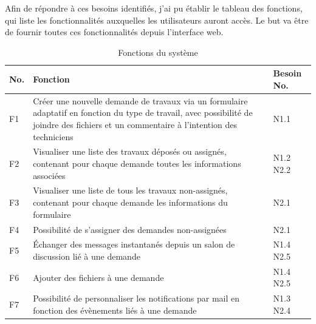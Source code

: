 \documentclass[
    iai, %
    eai, %
]{heig-tb}
\begin{document}
\newpage
Afin de répondre à ces besoins identifiés, j'ai pu établir le tableau des fonctions, qui liste les fonctionnalités auxquelles les utilisateurs auront accès.
Le but va être de fournir toutes ces fonctionnalités depuis l'interface web.

\begin{table}[h]
  \begin{center}
    \caption{Fonctions du système}
    \begin{tabularx}{\textwidth}[t]{p{0.5cm}Xp{1cm}}
      No. & Fonction                                                                                                                                                                                   & Besoin No.         \\ \toprule
      F1  & Créer une nouvelle demande de travaux via un formulaire adaptatif en fonction du type de travail, avec possibilité de joindre des fichiers et un commentaire à l'intention des techniciens & N1.1               \\ \midrule
      F2  & Visualiser une liste des travaux déposés ou assignés, contenant pour chaque demande toutes les informations associées                                                                      & N1.2 \newline N2.2 \\ \midrule
      F3  & Visualiser une liste de tous les travaux non-assignés, contenant pour chaque demande les informations du formulaire                                                                        & N2.1               \\ \midrule
      F4  & Possibilité de s'assigner des demandes non-assignées                                                                                                                                       & N2.1               \\ \midrule
      F5  & Échanger des messages instantanés depuis un salon de discussion lié à une demande                                                                                                          & N1.4 \newline N2.5 \\ \midrule
      F6  & Ajouter des fichiers à une demande                                                                                                                                                         & N1.4 \newline N2.5 \\ \midrule
      F7  & Possibilité de personnaliser les notifications par mail en fonction des évènements liés à une demande                                                                                      & N1.3 \newline N2.4 \\ \midrule

\end{tabularx}
\end{center}
\end{table}
\end{document}
